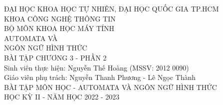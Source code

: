 \documentclass[12pt, a4paper]{article}
\begin{document}
	

	\begin{titlepage}
		\centering
		\large
		ĐẠI HỌC KHOA HỌC TỰ NHIÊN, ĐẠI HỌC QUỐC GIA TP.HCM\\[.1in]
		KHOA CÔNG NGHỆ THÔNG TIN\\BỘ MÔN KHOA HỌC MÁY TÍNH\\
		\vfill
		\huge AUTOMATA VÀ\\NGÔN NGỮ HÌNH THỨC\\[.1in]
		\LARGE BÀI TẬP CHƯƠNG 3 - PHẦN 2\\
		\vfill
		\RaggedRight
		\large
		Sinh viên thực hiện: Nguyễn Thế Hoàng (MSSV: 2012 0090)\\[.1in]
		Giáo viên phụ trách: Nguyễn Thanh Phương - Lê Ngọc Thành\\[.2in]
		\Centering
		BÀI TẬP MÔN HỌC - AUTOMATA VÀ NGÔN NGỮ HÌNH THỨC\\[.1in]
		HỌC KỲ II - NĂM HỌC 2022 - 2023
	\end{titlepage}
	
	\newpage	
	
	
\end{document}
